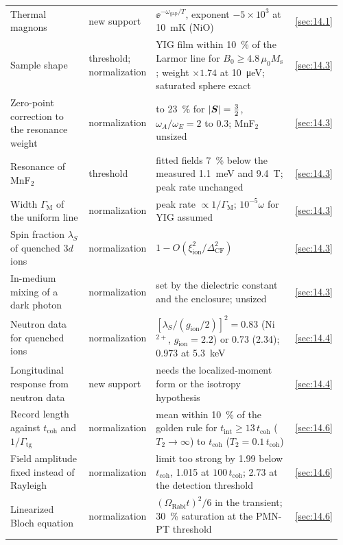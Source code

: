 \begin{table}[tbp]
\begin{tabular}{@{}>{\raggedright\arraybackslash}p{0.27\linewidth}>{\raggedright\arraybackslash}p{0.13\linewidth}>{\raggedright\arraybackslash}p{0.48\linewidth}>{\raggedright\arraybackslash}p{0.08\linewidth}@{}}
    Thermal magnons & new support & $\ee^{-\omega_{\mathrm{gap}}/T}$, exponent $-5\times10^3$ at \SI{10}{mK} (NiO) & \cref{sec:14.1} \\
    Sample shape & threshold; normali\-zation & YIG film within \SI{10}{\percent} of the Larmor line for $B_0 \ge 4.8\,\mu_0M_{\mathrm{s}}$; weight $\times1.74$ at \SI{10}{\micro eV}; saturated sphere exact & \cref{sec:14.3} \\
    Zero-point correction to the resonance weight & normali\-zation & 5 to \SI{23}{\percent} for $|\bm{S}| = \frac32$, $\omega_A/\omega_E = 2$ to 0.3; MnF$_2$ unsized & \cref{sec:14.3} \\
    Resonance of MnF$_2$ & threshold & fitted fields \SI{7}{\percent} below the measured \SI{1.1}{meV} and \SI{9.4}{T}; peak rate unchanged & \cref{sec:14.3} \\
    Width $\varGamma_{\mathrm{M}}$ of the uniform line & normali\-zation & peak rate $\propto 1/\varGamma_{\mathrm{M}}$; $10^{-5}\omega$ for YIG assumed & \cref{sec:14.3} \\
    Spin fraction $\lambda_S$ of quenched $3d$ ions & normali\-zation & $1 - O(\xi_{\mathrm{ion}}^2/\Delta_{\mathrm{CF}}^2)$ & \cref{sec:14.3} \\
    In-medium mixing of a dark photon & normali\-zation & set by the dielectric constant and the enclosure; unsized & \cref{sec:14.3} \\
    Neutron data for quenched ions & normali\-zation & $[\lambda_S/(g_{\mathrm{ion}}/2)]^2 = 0.83$ (Ni$^{2+}$, $g_{\mathrm{ion}} = 2.2$) or 0.73 (2.34); 0.973 at \SI{5.3}{keV} & \cref{sec:14.4} \\
    Longitudinal response from neutron data & new support & needs the localized-moment form or the isotropy hypothesis & \cref{sec:14.4} \\
    Record length against $t_{\mathrm{coh}}$ and $1/\varGamma_{\mathrm{tg}}$ & normali\-zation & mean within \SI{10}{\percent} of the golden rule for $t_{\mathrm{int}} \ge 13\,t_{\mathrm{coh}}$ ($T_2 \to \infty$) to $t_{\mathrm{coh}}$ ($T_2 = 0.1\,t_{\mathrm{coh}}$) & \cref{sec:14.6} \\
    Field amplitude fixed instead of Rayleigh & normali\-zation & limit too strong by 1.99 below $t_{\mathrm{coh}}$, 1.015 at $100\,t_{\mathrm{coh}}$; 2.73 at the detection threshold & \cref{sec:14.6} \\
    Linearized Bloch equation & normali\-zation & $(\Omega_{\mathrm{Rabi}}t)^2/6$ in the transient; \SI{30}{\percent} saturation at the PMN-PT threshold & \cref{sec:14.6} \\

\end{tabular}
\end{table}
